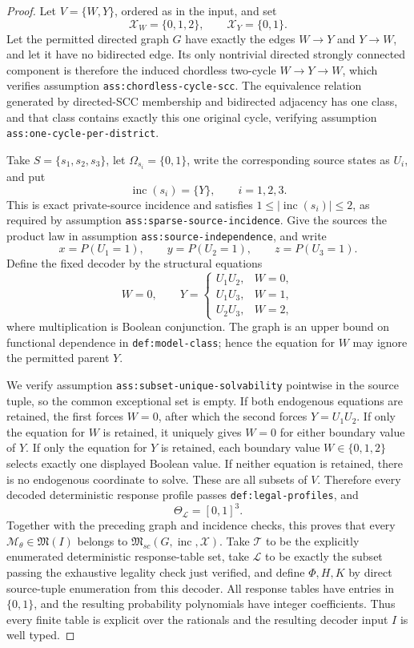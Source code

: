 \documentclass{article}
\begin{document}
\begin{proof}
Let \(V=\{W,Y\}\), ordered as in the input, and set
\[
 \mathcal X_W=\{0,1,2\},\qquad \mathcal X_Y=\{0,1\}.
\]
Let the permitted directed graph \(G\) have exactly the edges \(W\to Y\) and \(Y\to W\), and let it have no bidirected edge.  Its only nontrivial directed strongly connected component is therefore the induced chordless two-cycle \(W\to Y\to W\), which verifies assumption \texttt{ass:chordless-cycle-scc}.  The equivalence relation generated by directed-SCC membership and bidirected adjacency has one class, and that class contains exactly this one original cycle, verifying assumption \texttt{ass:one-cycle-per-district}.

Take \(S=\{s_1,s_2,s_3\}\), let \(\Omega_{s_i}=\{0,1\}\), write the corresponding source states as \(U_i\), and put
\[
 \operatorname{inc}(s_i)=\{Y\},\qquad i=1,2,3.
\]
This is exact private-source incidence and satisfies \(1\leq |\operatorname{inc}(s_i)|\leq2\), as required by assumption \texttt{ass:sparse-source-incidence}.  Give the sources the product law in assumption \texttt{ass:source-independence}, and write
\[
 x=P(U_1=1),\qquad y=P(U_2=1),\qquad z=P(U_3=1).
\]
Define the fixed decoder by the structural equations
\[
 W=0,
 \qquad
 Y=
 \begin{cases}
 U_1U_2,&W=0,\\
 U_1U_3,&W=1,\\
 U_2U_3,&W=2,
 \end{cases}
\]
where multiplication is Boolean conjunction.  The graph is an upper bound on functional dependence in \texttt{def:model-class}; hence the equation for \(W\) may ignore the permitted parent \(Y\).

We verify assumption \texttt{ass:subset-unique-solvability} pointwise in the source tuple, so the common exceptional set is empty.  If both endogenous equations are retained, the first forces \(W=0\), after which the second forces \(Y=U_1U_2\).  If only the equation for \(W\) is retained, it uniquely gives \(W=0\) for either boundary value of \(Y\).  If only the equation for \(Y\) is retained, each boundary value \(W\in\{0,1,2\}\) selects exactly one displayed Boolean value.  If neither equation is retained, there is no endogenous coordinate to solve.  These are all subsets of \(V\).  Therefore every decoded deterministic response profile passes \texttt{def:legal-profiles}, and
\[
 \Theta_{\mathcal L}=[0,1]^3.
\]
Together with the preceding graph and incidence checks, this proves that every \(\mathcal M_\theta\in\mathfrak M(I)\) belongs to \(\mathfrak M_{sc}(G,\operatorname{inc},\mathcal X)\).  Take \(\mathcal T\) to be the explicitly enumerated deterministic response-table set, take \(\mathcal L\) to be exactly the subset passing the exhaustive legality check just verified, and define \(\Phi,H,K\) by direct source-tuple enumeration from this decoder.  All response tables have entries in \(\{0,1\}\), and the resulting probability polynomials have integer coefficients.  Thus every finite table is explicit over the rationals and the resulting decoder input \(I\) is well typed.


\end{proof}
\end{document}
